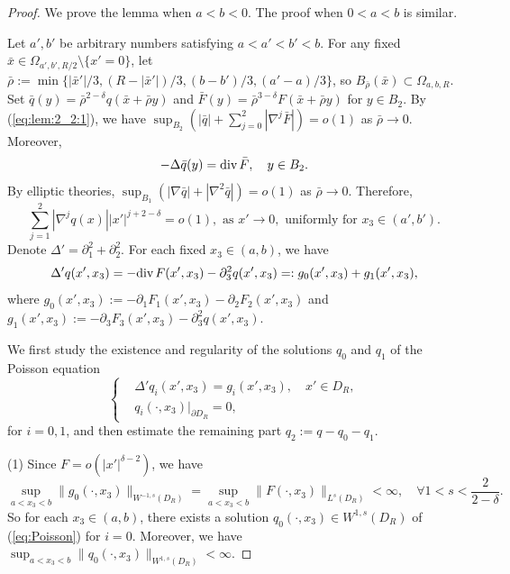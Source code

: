 \documentclass[12pt]{article}
\newcommand{\dive}{{\rm div \hspace{0.05cm} }}
\begin{document}
\begin{proof}
	We prove the lemma when $a<b<0$. The proof when $0<a<b$ is similar. 
	
	Let $a', b'$ be arbitrary numbers satisfying $a<a'<b'<b$. For any fixed $\bar{x}\in \Omega_{a', b', R/2} \setminus\{x'=0\}$, let $\bar{\rho}:=\min\{|\bar{x}'|/3, (R-|\bar{x}'|)/3, (b-b')/3, (a'-a)/3\}$, so $B_{\bar{\rho}}(\bar{x})\subset \Omega_{a, b, R}$. Set $\bar{q}(y)=\bar{\rho}^{2-\delta}q(\bar{x}+\bar{\rho}y)$ and $\bar{F}(y)=\bar{\rho}^{3-\delta}F(\bar{x}+\bar{\rho}y)$ for $y\in B_2$. By (\ref{eq:lem:2_2:1}), we have $\sup_{B_2}(|\bar{q}|+\sum_{j=0}^{2}|\nabla^j\bar{F}|)=o(1)$ as $\bar{\rho}\to 0$. Moreover, 
	\[
		-\Delta \bar{q}(y)=\dive \bar{F},
		\quad y\in B_2. 
	\] 
	By elliptic theories, $\sup_{B_1}(|\nabla \bar{q}|+|\nabla^2 \bar{q}|)=o(1)$ as $\bar{\rho}\to 0$. Therefore, 
	\begin{equation}\label{eq:lem:2_2:pf:1}
		\sum_{j=1}^{2}|\nabla^j q(x)| |x'|^{j+2-\delta}=o(1), 
		\textrm{ as }x'\to 0, \textrm{ uniformly for }x_3\in (a', b'). 
	\end{equation}
	Denote $\Delta' = \partial_1^2 + \partial_2^2$. For each fixed $x_3\in (a, b)$, we have
	\[
		\Delta' q(x',x_3)=-\dive F(x', x_3)-\partial_3^2q(x',x_3)=:g_0(x', x_3)+g_1(x', x_3), 
	\]
	where $g_0(x', x_3):=-\partial_1F_1(x', x_3)-\partial_2F_2(x', x_3)$ 
	and $g_1(x', x_3):=-\partial_3F_3(x', x_3)-\partial_3^2q(x',x_3)$. 
	
	We first study the existence and regularity of the solutions $q_0$ and $q_1$ of the Poisson equation 
	\begin{equation}\label{eq:Poisson}
	\left\{
	\begin{aligned}
		& \Delta' q_i(x', x_3)=g_i(x', x_3), \quad x'\in D_R, \\
		& q_i(\cdot, x_3)|_{\partial D_R}=0,
	\end{aligned}
	\right.
	\end{equation}
	for $i=0,1$, and then estimate the remaining part $q_2:=q-q_0-q_1$. 
	
	(1) Since $F=o(|x'|^{\delta-2})$, we have 
	 \[
	 \sup_{a<x_3<b}\|g_0(\cdot, x_3)\|_{W^{-1, s}(D_R)}=\sup_{a<x_3<b} \| F(\cdot, x_3) \|_{L^{s}(D_{R})}<\infty, \quad \forall 1< s<\frac{2}{2-\delta}. 
	 \]
	So for each $x_3\in (a, b)$, there exists a solution $q_0(\cdot, x_3)\in W^{1, s}(D_R)$ of (\ref{eq:Poisson}) for $i=0$. Moreover, we have $\sup_{a<x_3<b} \|q_0(\cdot, x_3) \|_{W^{1, s}(D_{R})}<\infty$.


\end{proof}
\end{document}
